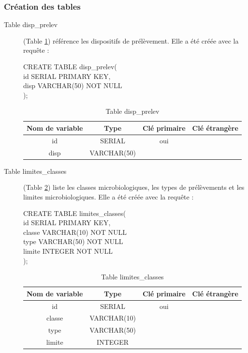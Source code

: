 \documentclass[12pt,a4paper,oneside]{article}
\begin{document}
\subsubsection{Création des tables}
\begin{description}
\item[Table disp\_prelev] (Table \ref{disp}) référence les dispositifs de prélèvement. Elle a été créée avec la requête :
\begin{tabbing}
CREATE TABLE disp\_prelev(\\
id SERIAL PRIMARY KEY,\\
disp VARCHAR(50) NOT NULL\\
);
\end{tabbing}
\begin{table}
\caption{Table disp\_prelev \label{disp}}
\begin{center}
\begin{tabular}{|c|c|c|c|}
	\hline
	\textbf{Nom de variable} & \textbf{Type} & \textbf{Clé primaire} & \textbf{Clé étrangère}\\
	\hline
	id & SERIAL & oui &\\
	disp & VARCHAR(50)& &\\
	\hline
\end{tabular}
\end{center}
\end{table}

\item[Table limites\_classes] (Table \ref{classes}) liste les classes microbiologiques, les types de prélèvements et les limites microbiologiques. Elle a été créée avec la requête :
\begin{tabbing}
CREATE TABLE limites\_classes(\\
id SERIAL PRIMARY KEY,\\
classe VARCHAR(10) NOT NULL\\
type VARCHAR(50) NOT NULL\\
limite INTEGER NOT NULL\\
);
\end{tabbing}
\begin{table}
\caption{Table limites\_classes \label{classes}}
\begin{center}
\begin{tabular}{|c|c|c|c|}
	\hline
	\textbf{Nom de variable} & \textbf{Type} & \textbf{Clé primaire} & \textbf{Clé étrangère}\\
	\hline
	id & SERIAL & oui &\\
	classe & VARCHAR(10)& &\\
	type & VARCHAR(50)& &\\
	limite & INTEGER & &\\
	\hline
\end{tabular}
\end{center}
\end{table}


\end{description}
\end{document}
